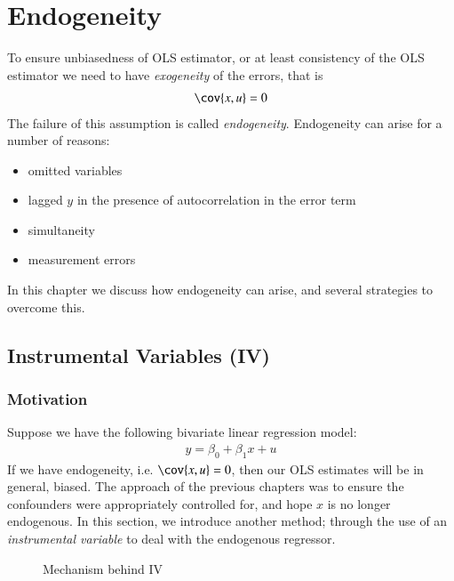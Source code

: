 \chapter{Endogeneity}

    To ensure unbiasedness of OLS estimator, or at least consistency of the OLS estimator we need to have \textit{exogeneity} of the errors, that is
    \begin{align}
        \cov{x,u} = 0
    \end{align}
    The failure of this assumption is called \textit{endogeneity}. Endogeneity can arise for a number of reasons:
    \begin{itemize}
        \item omitted variables
        \item lagged $y$ in the presence of autocorrelation in the error term
        \item simultaneity
        \item measurement errors
    \end{itemize}
    In this chapter we discuss how endogeneity can arise, and several strategies to overcome this.

    \section{Instrumental Variables (IV)}
        
        \subsection{Motivation}

            Suppose we have the following bivariate linear regression model:
            \begin{align}
                y = \beta_0 + \beta_1 x + u
            \end{align}
            If we have endogeneity, i.e. $\cov{x,u} = 0$, then our OLS estimates will be in general, biased. The approach of the previous chapters was to ensure the confounders were appropriately controlled for, and hope $x$ is no longer endogenous. In this section, we introduce another method; through the use of an \textit{instrumental variable} to deal with the endogenous regressor.
            \begin{figure}
                \centering
                
                \caption{Mechanism behind IV}
                \label{fig:IV}
            \end{figure}

